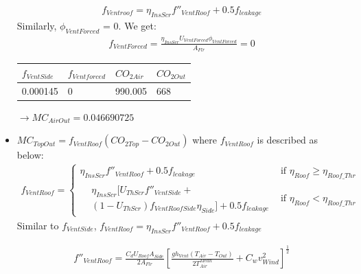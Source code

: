 \documentclass[a4paper]{article}
\numberwithin{equation}{section}
\begin{document}
\begin{itemize}
\begin{align*}
f_{Ventroof} =  \eta_{InsScr} f''_{VentRoof} + 0.5 f_{leakage}
\end{align*}
Similarly, $\phi_{VentForced}$ = 0. We get:
\begin{align*}
  f_{VentForced} = \frac{\eta_{InsScr} U_{VentForced} \phi_{VentForced} } {A_{Flr}} = 0
\end{align*}
\begin{table}[H]
\centering
\begin{tabular}{|l|l|l|l|}
\hline
\rowcolor[HTML]{FFFC9E} 
\cellcolor[HTML]{FFFC9E}\textbf{$f_{VentSide}$} & \cellcolor[HTML]{FFFC9E}\textbf{$f_{Ventforced}$} & \textbf{$CO_{2Air}$} & \textbf{$CO_{2Out}$} \\ \hline
0.000145                                      & 0                                       & 990.005                   & 668                              \\ \hline
\end{tabular}
\end{table}
$\rightarrow MC_{AirOut} = 0.046690725$

    \item $MC_{TopOut} = f_{VentRoof}(CO_{2Top} - CO_{2Out})$
where $f_{VentRoof}$ is described as below:
\begin{gather*}
  f_{VentRoof} =
  \begin{cases}
    \eta_{InsScr} f''_{VentRoof} + 0.5f_{leakage} & \text{if~} \eta_{Roof} \geq \eta_{Roof\_Thr} \\
    \begin{split}
      & \eta_{InsScr} [U_{ThScr}f''_{VentSide} + \\
      & (1-U_{ThScr})f_{VentRoofSide} \eta_{Side}] + 0.5 f_{leakage}
    \end{split}                    & \text{if~}  \eta_{Roof} < \eta_{Roof\_Thr}
  \end{cases}
\end{gather*}
Similar to $f_{VentSide}$, $f_{VentRoof} = \eta_{InsScr} f''_{VentRoof} + 0.5f_{leakage}$

\begin{align*}
f''_{VentRoof} = \frac{C_d U_{Roof} A_{Side}}{2A_{Flr}} {\left[\frac{gh_{Vent}(T_{Air} - T_{Out})}{2T^{Mean}_{Air}} + C_w v^2_{Wind}\right]}^{ \frac{1}{2}}
\end{align*}


\end{itemize}
\end{document}
